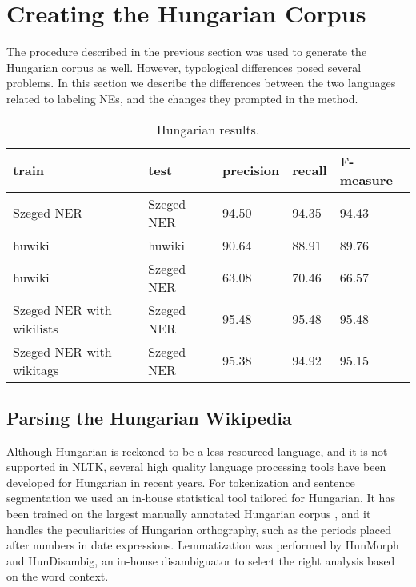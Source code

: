 \documentclass[11pt]{article}
\begin{document}
\section{Creating the Hungarian Corpus}
\label{sec:hun}

The procedure described in the previous section was used to generate the
Hungarian corpus as well. However, typological differences posed several
problems. In this section we describe the differences between the two
languages related to labeling NEs, and the changes they prompted in the
method.

\begin{table*}[ht]
\begin{center}
\begin{tabular}{lllll}
\hline \bf train & \bf test & \bf precision & \bf recall & \bf F-measure \\ \hline
Szeged NER & Szeged NER & 94.50 & 94.35 & 94.43 \\
huwiki & huwiki & 90.64 & 88.91 &  89.76 \\
huwiki & Szeged NER & 63.08 & 70.46 & 66.57 \\
Szeged NER with wikilists & Szeged NER & 95.48 & 95.48 & 95.48 \\
Szeged NER with wikitags & Szeged NER & 95.38 & 94.92 & 95.15 \\
\hline
\end{tabular}
\end{center}
\caption{\label{huresults} Hungarian results.}
\end{table*}

\subsection{Parsing the Hungarian Wikipedia}

Although Hungarian is reckoned to be a less resourced language, and it is not
supported in NLTK, several high quality language processing tools have been
developed for Hungarian in recent years. For tokenization and sentence
segmentation we used an in-house statistical tool tailored for Hungarian. It
has been trained on the largest manually annotated Hungarian corpus
\cite{Csendes:04}, and it handles the peculiarities of Hungarian orthography,
such as the periods placed after numbers in date expressions. Lemmatization
was performed by HunMorph \cite{Tron:05} and HunDisambig, an in-house
disambiguator to select the right analysis based on the word context.

\end{document}

